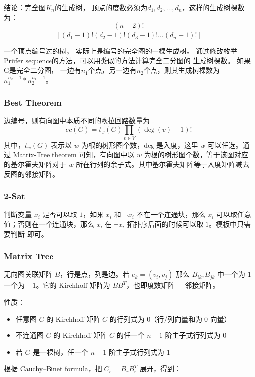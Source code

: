 结论：完全图$K_n$的生成树， 顶点的度数必须为$d_1, d_2, \ldots, d_n$，这样的生成树棵数为：
$$ \frac{(n-2)!}{[(d_1 - 1)! (d_2 - 1)! (d_3 - 1)! \ldots (d_n - 1)!]} $$

一个顶点编号过的树， 实际上是编号的完全图的一棵生成树。 通过修改枚举Prüfer sequence的方法，可以用类似的方法计算完全二分图的
生成树棵数。 如果G是完全二分图， 一边有$n_1$个点，另一边有$n_2$个点，则其生成树棵数为 $n_1 ^ {n_2 - 1} * n_2 ^ {n_1 - 1}$。

\subsubsection{Best Theorem}

边编号，则有向图中本质不同的欧拉回路数量为：
$$
ec(G) = t_w(G) \prod_{v \in V}{(\deg(v) - 1)!}
$$
其中，$t_w(G)$ 表示以 $w$ 为根的树形图个数，deg 是入度，这里 $w$ 可以任选。通过 Matrix-Tree theorem 可知，有向图中以 $w$ 为根的树形图个数，等于该图对应的基尔霍夫矩阵对于 $w$ 所在行列的余子式。其中基尔霍夫矩阵等于入度矩阵减去反图的邻接矩阵。

\subsubsection{2-Sat}

判断变量 $x_i$ 是否可以取 $1$，如果 $x_i$ 和 $\lnot x_i$ 不在一个连通块，那么 $x_i$ 可以取任意值；否则在一个连通块，那么 $x_i$ 在 $\lnot x_i$ 拓扑序后面的时候可以取 $1$。模板中只需要判断  即可。

\subsubsection{Matrix Tree}

无向图关联矩阵 $B$，行是点，列是边。若 $e_k=(v_i,v_j)$ 那么 $B_{ik},B_{jk}$ 中一个为 $1$ 一个为 $-1$。它的 Kirchhoff 矩阵为 $BB^T$，也即度数矩阵 $-$ 邻接矩阵。

性质：

\begin{itemize}
\item 任意图 $G$ 的 Kirchhoff 矩阵 $C$ 的行列式为 $0$（行/列向量和为 $0$ 向量）
\item 不连通图 $G$ 的 Kirchhoff 矩阵 $C$ 的任一个 $n-1$ 阶主子式行列式为 $0$
\item 若 $G$ 是一棵树，任一个 $n-1$ 阶主子式行列式为 $1$
\end{itemize}

根据 Cauchy–Binet formula，把 $C_r=B_rB_r^T$ 展开，得到：

